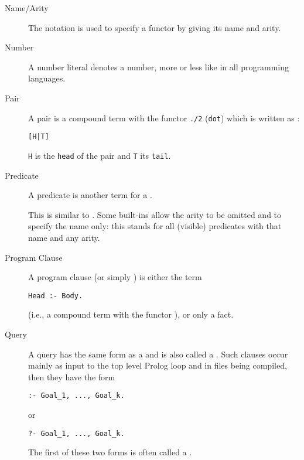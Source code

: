 \begin{description}
\item[Name/Arity]
The notation  is used to specify a functor by giving its
name and arity.

\item[Number]
A number literal denotes a number, more or less like in all programming
languages.

\item[Pair]
A pair is a compound term with the functor {\tt ./2} ({\tt dot})
which is written as :
\begin{verbatim}
[H|T]
\end{verbatim}
{\tt H} is the {\tt head}
of the pair and {\tt T} its {\tt tail}.


%
\item[Predicate]
A predicate is another term for a .

\item[]
This is similar to .
Some built-ins allow the arity to be omitted and to specify the name only:
this stands for all (visible) predicates with that name and any arity.

\item[Program Clause]
A program clause (or simply ) is either the term
\begin{verbatim}
Head :- Body.
\end{verbatim}
(i.e., a compound term with the functor ), or only a fact.

\item[Query]
A query  has the same form as a  and is also called a .
Such clauses occur mainly as input to the top level Prolog loop
and in files being compiled, then they have the form
\begin{verbatim}
:- Goal_1, ..., Goal_k.
\end{verbatim}
or
\begin{verbatim}
?- Goal_1, ..., Goal_k.
\end{verbatim}
The first of these two forms is often called a .


\end{description}
